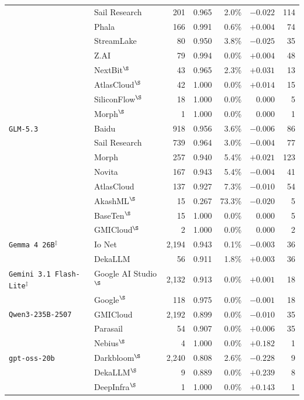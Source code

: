 \begin{table}[t]
\begin{tabular}{l l r r r r r}
 & Sail Research & 201 & 0.965 & 2.0\% & $-0.022$ & 114 \\
 & Phala & 166 & 0.991 & 0.6\% & $+0.004$ & 74 \\
 & StreamLake & 80 & 0.950 & 3.8\% & $-0.025$ & 35 \\
 & Z.AI & 79 & 0.994 & 0.0\% & $+0.004$ & 48 \\
 & NextBit$^{\S}$ & 43 & 0.965 & 2.3\% & $+0.031$ & 13 \\
 & AtlasCloud$^{\S}$ & 42 & 1.000 & 0.0\% & $+0.014$ & 15 \\
 & SiliconFlow$^{\S}$ & 18 & 1.000 & 0.0\% & $0.000$ & 5 \\
 & Morph$^{\S}$ & 1 & 1.000 & 0.0\% & $0.000$ & 1 \\
\texttt{GLM-5.3} & Baidu & 918 & 0.956 & 3.6\% & $-0.006$ & 86 \\
 & Sail Research & 739 & 0.964 & 3.0\% & $-0.004$ & 77 \\
 & Morph & 257 & 0.940 & 5.4\% & $+0.021$ & 123 \\
 & Novita & 167 & 0.943 & 5.4\% & $-0.004$ & 41 \\
 & AtlasCloud & 137 & 0.927 & 7.3\% & $-0.010$ & 54 \\
 & AkashML$^{\S}$ & 15 & 0.267 & 73.3\% & $-0.020$ & 5 \\
 & BaseTen$^{\S}$ & 15 & 1.000 & 0.0\% & $0.000$ & 5 \\
 & GMICloud$^{\S}$ & 2 & 1.000 & 0.0\% & $0.000$ & 2 \\
\texttt{Gemma 4 26B}$^{\ddagger}$ & Io Net & 2,194 & 0.943 & 0.1\% & $-0.003$ & 36 \\
 & DekaLLM & 56 & 0.911 & 1.8\% & $+0.003$ & 36 \\
\texttt{Gemini 3.1 Flash-Lite}$^{\ddagger}$ & Google AI Studio$^{\S}$ & 2,132 & 0.913 & 0.0\% & $+0.001$ & 18 \\
 & Google$^{\S}$ & 118 & 0.975 & 0.0\% & $-0.001$ & 18 \\
\texttt{Qwen3-235B-2507} & GMICloud & 2,192 & 0.899 & 0.0\% & $-0.010$ & 35 \\
 & Parasail & 54 & 0.907 & 0.0\% & $+0.006$ & 35 \\
 & Nebius$^{\S}$ & 4 & 1.000 & 0.0\% & $+0.182$ & 1 \\
\texttt{gpt-oss-20b} & Darkbloom$^{\S}$ & 2,240 & 0.808 & 2.6\% & $-0.228$ & 9 \\
 & DekaLLM$^{\S}$ & 9 & 0.889 & 0.0\% & $+0.239$ & 8 \\
 & DeepInfra$^{\S}$ & 1 & 1.000 & 0.0\% & $+0.143$ & 1 \\

\end{tabular}
\end{table}

